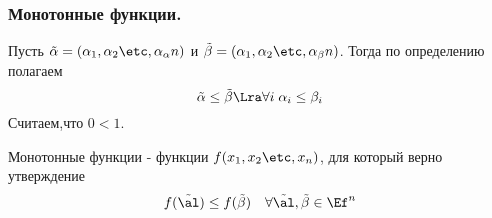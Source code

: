\documentclass[unicode, 10pt, a4paper, oneside, fleqn]{article}
\begin{document}
\subsubsection{Монотонные функции.}
  \begin{df}
     Пусть $\gset{n}$ и $\gset[\beta]{n}$. Тогда по определению полагаем
     \begin{displaymath}
       \tilde\alpha \le \tilde\beta \Lra\forall i \; \alpha_i \le \beta_i
     \end{displaymath}
     Считаем,что $0<1$.
  \end{df}
  \begin{df}
    Монотонные функции - функции $f(\set[x]{n})$, для который верно утверждение
    \begin{displaymath}
      f(\alt)\le f(\tilde\beta)\quad\forall \alt,\tilde\beta \in \Ef^n
    \end{displaymath}
  \end{df}
  \property
\end{document}
